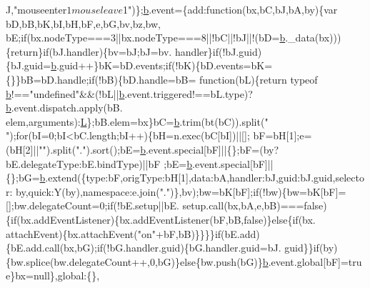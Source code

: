 \begin{DoxyCode}
      J,\textcolor{stringliteral}{"mouseenter$1 mouseleave$1"})\};\hyperlink{jquery_8js_aa4026ad5544b958e54ce5e106fa1c805}{b}.event=\{add:\textcolor{keyword}{function}(bx,bC,bJ,bA,by)\{var bD,bB,bK,bI,bH,bF,e,bG,bv,bz,bw,
      bE;\textcolor{keywordflow}{if}(bx.nodeType===3||bx.nodeType===8||!bC||!bJ||!(bD=\hyperlink{jquery_8js_aa4026ad5544b958e54ce5e106fa1c805}{b}.\_data(bx)))\{\textcolor{keywordflow}{return}\}\textcolor{keywordflow}{if}(bJ.handler)\{bv=bJ;bJ=bv.
      handler\}\textcolor{keywordflow}{if}(!bJ.guid)\{bJ.guid=\hyperlink{jquery_8js_aa4026ad5544b958e54ce5e106fa1c805}{b}.guid++\}bK=bD.events;\textcolor{keywordflow}{if}(!bK)\{bD.events=bK=\{\}\}bB=bD.handle;\textcolor{keywordflow}{if}(!bB)\{bD.handle=bB=\textcolor{keyword}{
      function}(bL)\{\textcolor{keywordflow}{return} typeof \hyperlink{jquery_8js_aa4026ad5544b958e54ce5e106fa1c805}{b}!==\textcolor{stringliteral}{"undefined"}&&(!bL||\hyperlink{jquery_8js_aa4026ad5544b958e54ce5e106fa1c805}{b}.event.triggered!==bL.type)?\hyperlink{jquery_8js_aa4026ad5544b958e54ce5e106fa1c805}{b}.event.dispatch.apply(bB.
      elem,arguments):\hyperlink{jquery_8js_a38ee4c0b5f4fe2a18d0c783af540d253}{L}\};bB.elem=bx\}bC=\hyperlink{jquery_8js_aa4026ad5544b958e54ce5e106fa1c805}{b}.trim(bt(bC)).split(\textcolor{stringliteral}{" "});\textcolor{keywordflow}{for}(bI=0;bI<bC.length;bI++)\{bH=n.exec(bC[bI])||[];
      bF=bH[1];e=(bH[2]||\textcolor{stringliteral}{""}).split(\textcolor{stringliteral}{"."}).sort();bE=\hyperlink{jquery_8js_aa4026ad5544b958e54ce5e106fa1c805}{b}.event.special[bF]||\{\};bF=(by?bE.delegateType:bE.bindType)||bF
      ;bE=\hyperlink{jquery_8js_aa4026ad5544b958e54ce5e106fa1c805}{b}.event.special[bF]||\{\};bG=\hyperlink{jquery_8js_aa4026ad5544b958e54ce5e106fa1c805}{b}.extend(\{type:bF,origType:bH[1],data:bA,handler:bJ,guid:bJ.guid,selector:
      by,quick:Y(by),\textcolor{keyword}{namespace}:e.join(\textcolor{stringliteral}{"."})\},bv);bw=bK[bF];\textcolor{keywordflow}{if}(!bw)\{bw=bK[bF]=[];bw.delegateCount=0;\textcolor{keywordflow}{if}(!bE.setup||bE.
      setup.call(bx,bA,e,bB)===\textcolor{keyword}{false})\{\textcolor{keywordflow}{if}(bx.addEventListener)\{bx.addEventListener(bF,bB,\textcolor{keyword}{false})\}\textcolor{keywordflow}{else}\{\textcolor{keywordflow}{if}(bx.
      attachEvent)\{bx.attachEvent(\textcolor{stringliteral}{"on"}+bF,bB)\}\}\}\}\textcolor{keywordflow}{if}(bE.add)\{bE.add.call(bx,bG);\textcolor{keywordflow}{if}(!bG.handler.guid)\{bG.handler.guid=bJ.
      guid\}\}\textcolor{keywordflow}{if}(by)\{bw.splice(bw.delegateCount++,0,bG)\}\textcolor{keywordflow}{else}\{bw.push(bG)\}\hyperlink{jquery_8js_aa4026ad5544b958e54ce5e106fa1c805}{b}.event.global[bF]=\textcolor{keyword}{true}\}bx=null\},global:\{\},\textcolor{keyword}{
}
\end{DoxyCode}
